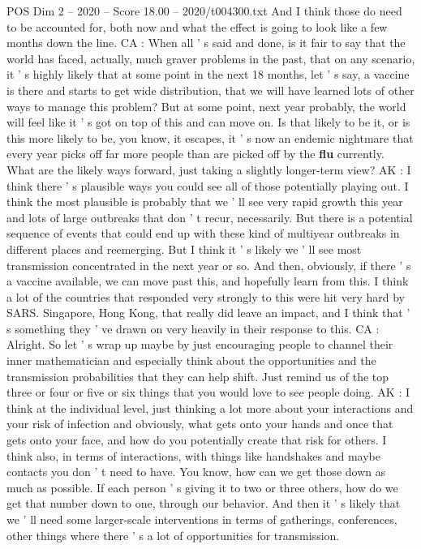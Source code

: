\begin{textsample}{POS Dim 2 – 2020 – Score 18.00 – 2020/t004300.txt}
And I think those do need to be accounted for, both now and what the effect is going to look like a few months down the line.
CA : When all ' s said and done, is it fair to say that the world has faced, actually, much graver problems in the past, that on any scenario, it ' s highly likely that at some point in the next 18 months, let ' s say, a vaccine is there and starts to get wide distribution, that we will have learned lots of other ways to manage this problem?
But at some point, next year probably, the world will feel like it ' s got on top of this and can move on.
Is that likely to be it, or is this more likely to be, you know, it escapes, it ' s now an endemic nightmare that every year picks off far more people than are picked off by the \textbf{flu} currently.
What are the likely ways forward, just taking a slightly longer-term view?
AK : I think there ' s plausible ways you could see all of those potentially playing out.
I think the most plausible is probably that we ' ll see very rapid growth this year and lots of large outbreaks that don ' t recur, necessarily.
But there is a potential sequence of events that could end up with these kind of multiyear outbreaks in different places and reemerging.
But I think it ' s likely we ' ll see most transmission concentrated in the next year or so.
And then, obviously, if there ' s a vaccine available, we can move past this, and hopefully learn from this.
I think a lot of the countries that responded very strongly to this were hit very hard by SARS.
Singapore, Hong Kong, that really did leave an impact, and I think that ' s something they ' ve drawn on very heavily in their response to this.
CA : Alright.
So let ' s wrap up maybe by just encouraging people to channel their inner mathematician and especially think about the opportunities and the transmission probabilities that they can help shift.
Just remind us of the top three or four or five or six things that you would love to see people doing.
AK : I think at the individual level, just thinking a lot more about your interactions and your risk of infection and obviously, what gets onto your hands and once that gets onto your face, and how do you potentially create that risk for others.
I think also, in terms of interactions, with things like handshakes and maybe contacts you don ' t need to have.
You know, how can we get those down as much as possible.
If each person ' s giving it to two or three others, how do we get that number down to one, through our behavior.
And then it ' s likely that we ' ll need some larger-scale interventions in terms of gatherings, conferences, other things where there ' s a lot of opportunities for transmission.

\end{textsample}
